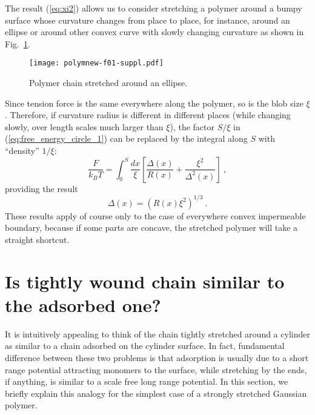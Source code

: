 \documentclass[aps,pre,floatfix,twocolumn,nofootinbib]{revtex4-2}
\newcommand{\be}{\begin{equation}}
\newcommand{\ee}{\end{equation}}
\newcommand{\eq}[1]{(\ref{#1})}
\newcommand{\fig}[1]{Fig.~\ref{#1}}
\begin{document}
The result \eq{eq:xi2} allows us to consider stretching a polymer around a bumpy surface whose curvature changes from place to place, for instance, around an ellipse or around other convex curve with slowly changing curvature as shown in \fig{fig:Bumpy_Surface}.


\begin{figure}[ht]
  \centering
  \texttt{[image: polymnew-f01-suppl.pdf]}
  \caption{Polymer chain stretched around an ellipse.}
  \label{fig:Bumpy_Surface}
\end{figure}

Since tension force is the same everywhere along the polymer, so is the blob size $\xi$. Therefore, if curvature radius is different in different places (while changing slowly, over length scales much larger than $\xi$), the factor $S/\xi$ in \eq{eq:free_energy_circle_1} can be replaced by the integral along $S$ with ``density'' $1/\xi$:
\be
\frac{F}{k_B T}  =  \int_{0}^{S} \frac{dx}{\xi} \left[ \frac{\Delta(x)}{R(x)}  +  \frac{\xi^2 }{\Delta^2(x)}\right] \ , \label{eq:free_energy_circle_2}
\ee
providing the result
\be
\Delta(x) = \left(R(x) \xi^2 \right)^{1/3} \ .
\label{eq:curv}
\ee
These results apply of course only to the case of everywhere convex impermeable boundary, because if some parts are concave, the stretched polymer will take a straight shortcut.

\section{Is tightly wound chain similar to the adsorbed one?}\label{app_adsorbed}

It is intuitively appealing to think of the chain tightly stretched around a cylinder as similar to a chain adsorbed on the cylinder surface.  In fact, fundamental difference between these two problems is that adsorption is usually due to a short range potential attracting monomers to the surface, while stretching by the ends, if anything, is similar to a scale free long range potential.  In this section, we briefly explain this analogy for the simplest case of a strongly stretched Gaussian polymer.
\end{document}

